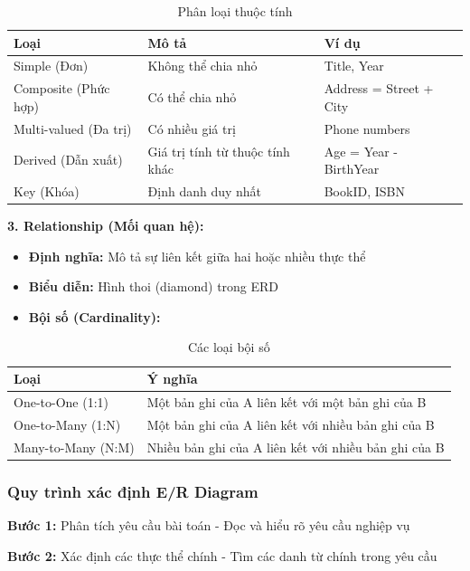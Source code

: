 \documentclass[12pt,a4paper]{article}
\begin{document}
\begin{table}[H]
\centering
\caption{Phân loại thuộc tính}
\begin{tabular}{@{}|l|p{8cm}|l|@{}}
\hline
\textbf{Loại} & \textbf{Mô tả} & \textbf{Ví dụ} \\ \hline
Simple (Đơn) & Không thể chia nhỏ & Title, Year \\ \hline
Composite (Phức hợp) & Có thể chia nhỏ & Address = Street + City \\ \hline
Multi-valued (Đa trị) & Có nhiều giá trị & Phone numbers \\ \hline
Derived (Dẫn xuất) & Giá trị tính từ thuộc tính khác & Age = Year - BirthYear \\ \hline
Key (Khóa) & Định danh duy nhất & BookID, ISBN \\ \hline
\end{tabular}
\end{table}

\textbf{3. Relationship (Mối quan hệ):}
\begin{itemize}
    \item \textbf{Định nghĩa:} Mô tả sự liên kết giữa hai hoặc nhiều thực thể
    \item \textbf{Biểu diễn:} Hình thoi (diamond) trong ERD
    \item \textbf{Bội số (Cardinality):}
\end{itemize}

\begin{table}[H]
\centering
\caption{Các loại bội số}
\begin{tabular}{@{}|l|l|@{}}
\hline
\textbf{Loại} & \textbf{Ý nghĩa} \\ \hline
One-to-One (1:1) & Một bản ghi của A liên kết với một bản ghi của B \\ \hline
One-to-Many (1:N) & Một bản ghi của A liên kết với nhiều bản ghi của B \\ \hline
Many-to-Many (N:M) & Nhiều bản ghi của A liên kết với nhiều bản ghi của B \\ \hline
\end{tabular}
\end{table}

\subsubsection{Quy trình xác định E/R Diagram}

\textbf{Bước 1:} Phân tích yêu cầu bài toán - Đọc và hiểu rõ yêu cầu nghiệp vụ

\textbf{Bước 2:} Xác định các thực thể chính - Tìm các danh từ chính trong yêu cầu
\end{document}
